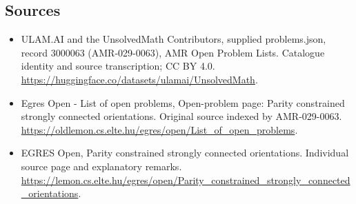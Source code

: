 \documentclass[11pt,a4paper]{article}
\begin{document}
\subsection{Sources}
\begin{itemize}
\item[S1] ULAM.AI and the UnsolvedMath Contributors, supplied problems.json, record 3000063 (AMR-029-0063), AMR Open Problem Lists. Catalogue identity and source transcription; CC BY 4.0.
\url{https://huggingface.co/datasets/ulamai/UnsolvedMath}.
\item[S2] Egres Open - List of open problems, Open-problem page: Parity constrained strongly connected orientations. Original source indexed by AMR-029-0063.
\url{https://oldlemon.cs.elte.hu/egres/open/List_of_open_problems}.
\item[S3] EGRES Open, Parity constrained strongly connected orientations. Individual source page and explanatory remarks.
\url{https://lemon.cs.elte.hu/egres/open/Parity_constrained_strongly_connected_orientations}.
\end{itemize}
\end{document}
